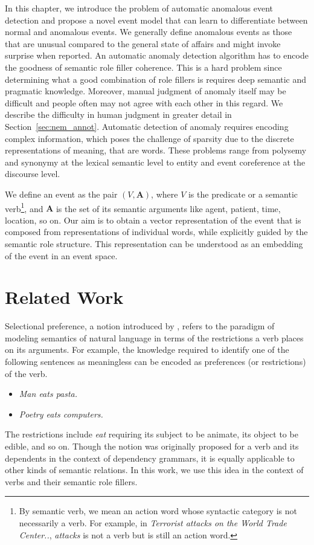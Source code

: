 In this chapter, we introduce the problem of automatic anomalous event
detection and propose a novel event model that can learn to differentiate
between normal
and anomalous events. We generally define anomalous events as those that are
unusual compared
to the general state of affairs and might invoke surprise when reported. An 
automatic
anomaly detection algorithm has to encode
the goodness of semantic role filler coherence.  This is a hard problem since
determining what a good combination of role fillers is 
requires deep semantic and pragmatic knowledge.  
Moreover, manual judgment of anomaly itself may be difficult and people often
may not agree with each other in this
regard.  We describe the difficulty in human judgment in greater detail in
Section~\ref{sec:nem_annot}.  
Automatic detection of anomaly requires encoding complex information, which
poses the challenge of sparsity
due to the discrete representations of meaning, that are words.  These problems
range from polysemy and synonymy at the 
lexical semantic level to entity and event coreference at the discourse level.

We define an event as the pair $(V, \textbf{A})$, where $V$
is the predicate or a semantic verb\footnote{By semantic verb, we mean an action 
word whose
syntactic category is not necessarily a verb.  
For example, in \textit{Terrorist attacks on the World Trade Center..},
\textit{attacks} is not a verb but is still an 
action word.}, and $\textbf{A}$ is the set of its semantic arguments like agent,
patient, time, location, so on. Our aim
is to obtain a vector representation of the event that is composed from
representations of individual words, while explicitly guided by the semantic
role structure. This representation can be understood as an embedding of the
event in an event space. 

\section{Related Work} \label{sec:nem_background}
Selectional preference, a notion introduced by \cite{wilks1973preference}, 
refers to the paradigm of modeling semantics of
natural language in terms of the restrictions a verb places on its arguments. 
For example, the knowledge required to identify
one of the following sentences as meaningless can be encoded as preferences (or 
restrictions) of the verb.
\begin{itemize}
 \item[] \textit{Man eats pasta.}
 \item[] \textit{Poetry eats computers.}
\end{itemize}
The restrictions include \textit{eat} requiring its subject to be animate, its 
object to be edible, and so on. Though the
notion was originally proposed for a verb and its dependents in the context of 
dependency grammars, it is equally applicable to
other kinds of semantic relations. In this work,
we use this idea in the context of verbs and their semantic role fillers.

